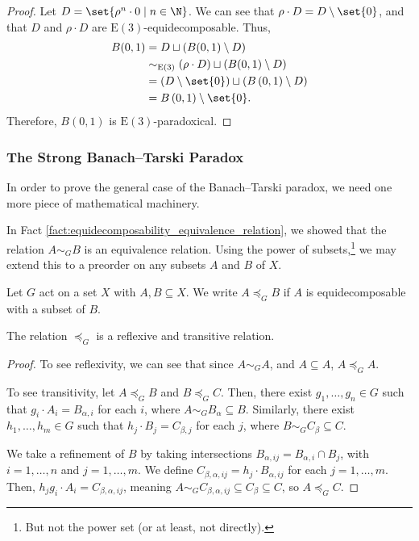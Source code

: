 \documentclass[10pt]{mypackage2}
\begin{document}
\begin{proof}
  Let $D = \set{\rho^{n}\cdot 0\mid n\in \N}$. We can see that $\rho\cdot D = D\setminus \set{0}$, and that $D$ and $\rho\cdot D$ are $\text{E}(3)$-equidecomposable. Thus,
  \begin{align*}
    B(0,1) &= D\sqcup \left(B(0,1)\setminus D\right)\\
           &\sim_{\text{E}(3)}\left(\rho\cdot D\right) \sqcup \left(B(0,1)\setminus D\right)\\
           &= \left(D\setminus \set{0}\right)\sqcup \left(B\left(0,1\right)\setminus D\right)\\
           &= B\left(0,1\right)\setminus \set{0}.
  \end{align*}
  Therefore, $B(0,1)$ is $\text{E}(3)$-paradoxical.
\end{proof}
\subsubsection{The Strong Banach--Tarski Paradox}%
In order to prove the general case of the Banach--Tarski paradox, we need one more piece of mathematical machinery.\newline

In Fact \ref{fact:equidecomposability_equivalence_relation}, we showed that the relation $A\sim_{G} B$ is an equivalence relation. Using the power of subsets,\footnote{But not the power set (or at least, not directly).} we may extend this to a preorder on any subsets $A$ and $B$ of $X$.
\begin{definition}
  Let $G$ act on a set $X$ with $A,B\subseteq X$. We write $A\preceq_{G}B$ if $A$ is equidecomposable with a subset of $B$.
\end{definition}
\begin{fact}
  The relation $\preceq_{G}$ is a reflexive and transitive relation.\label{fact:preorder}
\end{fact}
\begin{proof}
  To see reflexivity, we can see that since $A\sim_{G}A$, and $A\subseteq A$, $A\preceq_{G} A$.\newline

  To see transitivity, let $A\preceq_{G}B$ and $B\preceq_{G}C$. Then, there exist $g_1,\dots,g_n\in G$ such that $g_i\cdot A_i = B_{\alpha,i}$ for each $i$, where $A\sim_{G}B_{\alpha}\subseteq B$. Similarly, there exist $h_1,\dots,h_m\in G$ such that $h_j\cdot B_j= C_{\beta,j}$ for each $j$, where $B\sim_{G}C_{\beta}\subseteq C$.\newline

  We take a refinement of $B$ by taking intersections $B_{\alpha,ij} = B_{\alpha,i}\cap B_j$, with $i=1,\dots,n$ and $j = 1,\dots,m$. We define $C_{\beta,\alpha,ij} = h_j\cdot B_{\alpha,ij}$ for each $j = 1,\dots,m$. Then, $h_jg_i\cdot A_i = C_{\beta,\alpha,ij}$, meaning $A\sim_{G}C_{\beta,\alpha,ij}\subseteq C_{\beta}\subseteq C$, so $A\preceq_{G}C$.
\end{proof}
\end{document}
